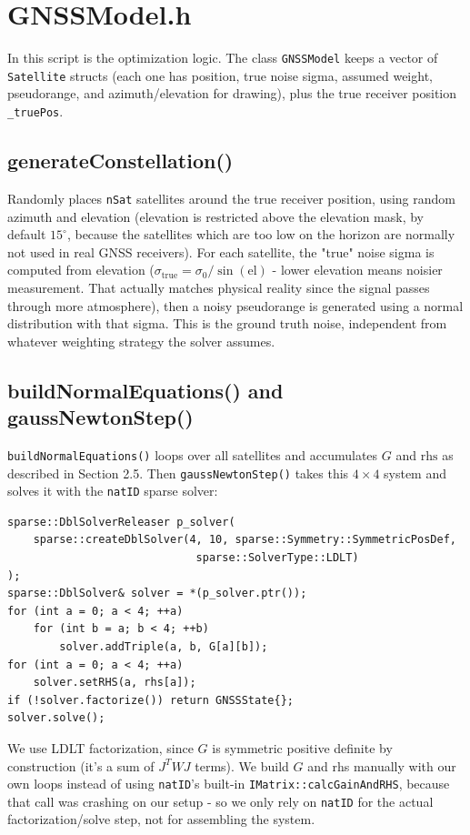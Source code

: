 \documentclass[11pt]{article}
\begin{document}
\section{GNSSModel.h}

In this script is the optimization logic. The class \texttt{GNSSModel} keeps a vector of \texttt{Satellite} structs (each one has position, true noise sigma, assumed weight, pseudorange, and azimuth/elevation for drawing), plus the true receiver position \texttt{\_truePos}.

\subsection{generateConstellation()}

Randomly places \texttt{nSat} satellites around the true receiver position, using random azimuth and elevation (elevation is restricted above the elevation mask, by default $15^\circ$, because the satellites which are too low on the horizon are normally not used in real GNSS receivers). For each satellite, the "true" noise sigma is computed from elevation ($\sigma_{\text{true}} = \sigma_0/\sin(\text{el})$ - lower elevation means noisier measurement. That actually matches physical reality since the signal passes through more atmosphere), then a noisy pseudorange is generated using a normal distribution with that sigma. This is the ground truth noise, independent from whatever weighting strategy the solver assumes.

\subsection{buildNormalEquations() and gaussNewtonStep()}

\texttt{buildNormalEquations()} loops over all satellites and accumulates $G$ and $\text{rhs}$ as described in Section 2.5. Then \texttt{gaussNewtonStep()} takes this $4\times4$ system and solves it with the \texttt{natID} sparse solver:

\begin{lstlisting}
sparse::DblSolverReleaser p_solver(
    sparse::createDblSolver(4, 10, sparse::Symmetry::SymmetricPosDef,
                             sparse::SolverType::LDLT)
);
sparse::DblSolver& solver = *(p_solver.ptr());
for (int a = 0; a < 4; ++a)
    for (int b = a; b < 4; ++b)
        solver.addTriple(a, b, G[a][b]);
for (int a = 0; a < 4; ++a)
    solver.setRHS(a, rhs[a]);
if (!solver.factorize()) return GNSSState{};
solver.solve();
\end{lstlisting}
 We use LDLT factorization, since $G$ is symmetric positive definite by construction (it's a sum of $J^T W J$ terms). We build $G$ and rhs manually with our own loops instead of using \texttt{natID}'s built-in \texttt{IMatrix::calcGainAndRHS}, because that call was crashing on our setup - so we only rely on \texttt{natID} for the actual factorization/solve step, not for assembling the system.
\end{document}

